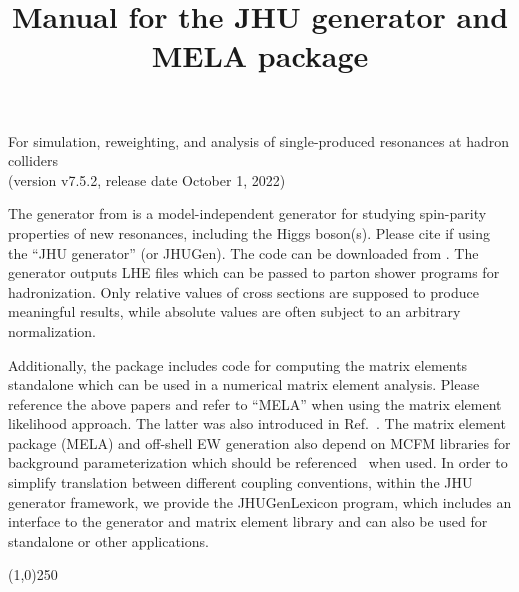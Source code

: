 \documentclass[aps,superscriptaddress,nofootinbib]{revtex4}
\begin{document}
\vspace{0.6cm}

\title{
\large
Manual for the JHU generator and MELA package
}
\maketitle
\begin{center}
\small
For simulation, reweighting, and analysis of single-produced resonances at hadron colliders \\
(version v7.5.2, release date October 1, 2022) \\
\normalsize
\end{center}

\noindent
The generator from \cite{Gao:2010qx,Bolognesi:2012,Anderson:2013,Gritsan:2016hjl,Gritsan:2020pib,Martini:2021uey,Davis:2022} 
is a model-independent generator for studying spin-parity properties of new resonances, including the Higgs boson(s). 
Please cite \cite{Gao:2010qx,Bolognesi:2012,Anderson:2013,Gritsan:2016hjl,Gritsan:2020pib,Martini:2021uey,Davis:2022} 
if using the ``JHU generator'' (or JHUGen). The code can be downloaded from \cite{thesite}.
The generator outputs LHE files which can be passed to parton shower programs for hadronization.
Only relative values of cross sections are supposed to produce meaningful results, 
while absolute values are often subject to an arbitrary normalization.

Additionally, the package includes code for computing the matrix elements standalone which can be used in a numerical matrix element analysis.
Please reference the above papers and refer to ``MELA'' when using the matrix element likelihood approach.
The latter was also introduced in Ref.~\cite{Chatrchyan:2012ufa}. The matrix element package (MELA) and off-shell EW generation 
also depend on MCFM libraries for background parameterization which should be referenced~\cite{Campbell:2010ff} when used.
In order to simplify translation between different coupling conventions, within the JHU generator framework, we provide the JHUGenLexicon program,
which includes an interface to the generator and matrix element library and can also be used for standalone or other applications. 


\vspace{0.5cm}
\begin{center}
\line(1,0){250}
\end{center}
\vspace{0.5cm}
\tableofcontents
\begin{center}
\end{center}
\vspace{0.5cm}
\end{document}
